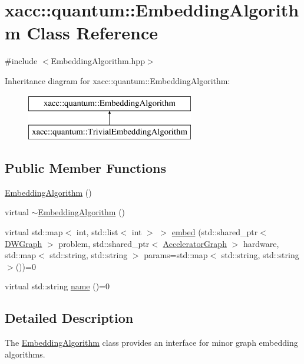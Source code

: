 \hypertarget{a00037}{}\section{xacc\+:\+:quantum\+:\+:Embedding\+Algorithm Class Reference}
\label{a00037}


{\ttfamily \#include $<$Embedding\+Algorithm.\+hpp$>$}

Inheritance diagram for xacc\+:\+:quantum\+:\+:Embedding\+Algorithm\+:\begin{figure}[H]
\begin{center}
\leavevmode
\includegraphics[height=2.000000cm]{a00037}
\end{center}
\end{figure}
\subsection*{Public Member Functions}
\begin{DoxyCompactItemize}
\item 
\hyperlink{a00037_abad06507eef6b63af0884e3a96145c69}{Embedding\+Algorithm} ()
\item 
virtual \hyperlink{a00037_aa43660ad5d4c4b3ac67863892c33dc51}{$\sim$\+Embedding\+Algorithm} ()
\item 
virtual std\+::map$<$ int, std\+::list$<$ int $>$ $>$ \hyperlink{a00037_a6fca277e217884ff79802770189276fe}{embed} (std\+::shared\+\_\+ptr$<$ \hyperlink{a00030}{D\+W\+Graph} $>$ problem, std\+::shared\+\_\+ptr$<$ \hyperlink{a00043}{Accelerator\+Graph} $>$ hardware, std\+::map$<$ std\+::string, std\+::string $>$ params=std\+::map$<$ std\+::string, std\+::string $>$())=0
\item 
virtual std\+::string \hyperlink{a00037_a21079dc8ee37792977f5fd209e3f3b19}{name} ()=0
\end{DoxyCompactItemize}


\subsection{Detailed Description}
The \hyperlink{a00037}{Embedding\+Algorithm} class provides an interface for minor graph embedding algorithms. 

